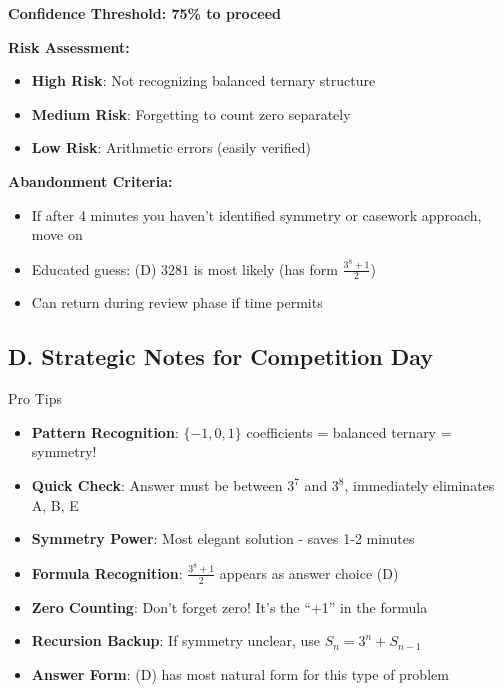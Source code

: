 \documentclass[12pt]{article}
\begin{document}
\begin{competitionbox}
\textbf{Confidence Threshold: 75\% to proceed}

\textbf{Risk Assessment:}
\begin{itemize}
    \item \textbf{High Risk}: Not recognizing balanced ternary structure
    \item \textbf{Medium Risk}: Forgetting to count zero separately
    \item \textbf{Low Risk}: Arithmetic errors (easily verified)
\end{itemize}

\textbf{Abandonment Criteria:}
\begin{itemize}
    \item If after 4 minutes you haven't identified symmetry or casework approach, move on
    \item Educated guess: (D) $3281$ is most likely (has form $\frac{3^8+1}{2}$)
    \item Can return during review phase if time permits
\end{itemize}

\subsection*{D. Strategic Notes for Competition Day}

\begin{highlightbox}{Pro Tips}
\begin{itemize}
    \item \textbf{Pattern Recognition}: $\{-1,0,1\}$ coefficients = balanced ternary = symmetry!
    \item \textbf{Quick Check}: Answer must be between $3^7$ and $3^8$, immediately eliminates A, B, E
    \item \textbf{Symmetry Power}: Most elegant solution - saves 1-2 minutes
    \item \textbf{Formula Recognition}: $\frac{3^8+1}{2}$ appears as answer choice (D)
    \item \textbf{Zero Counting}: Don't forget zero! It's the ``+1'' in the formula
    \item \textbf{Recursion Backup}: If symmetry unclear, use $S_n = 3^n + S_{n-1}$
    \item \textbf{Answer Form}: (D) has most natural form for this type of problem
\end{itemize}
\end{highlightbox}

\end{competitionbox}
\end{document}
